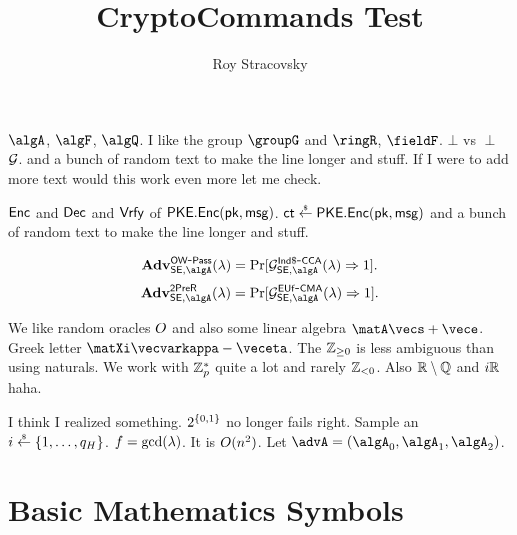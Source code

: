 \documentclass[11pt, oneside]{article}
\title{CryptoCommands Test}
\author{Roy Stracovsky}
\begin{document}
\maketitle


$\algA$, $\algF$, $\algQ$. I like the group $\groupG$ and $\ringR$, $\fieldF$. $\bot$ vs $\perp$
$\mathcal{G}$. and a bunch of random text to make the line longer and stuff. If I were to add more text would this work even more let me check.

$\mathsf{Enc}$ and $\mathsf{Dec}$ and $\mathsf{Vrfy}$ of $\mathsf{PKE}.\mathsf{Enc}(\mathsf{pk}, \mathsf{msg})$.
$\ct \sample \PKEncScheme.\PKEnc(\pk, \msg)$ and a bunch of random text to make the line longer and stuff.

$$ \Adv{\OWPass}{\SEncScheme, \algA}{\secpar} = \Pr[\game^\IndRCCA_{\SEncScheme, \algA}(\secpar) \outputs 1].$$
$$ \Adv{\SecPreimageRes}{\SEncScheme, \algA}{\secpar} = \Pr[\game^\EUfCMA_{\SEncScheme, \algA}(\secpar) \outputs 1].$$

We like random oracles $O$ and also some linear algebra $\matA\vecs + \vece$. Greek letter $\matXi\vecvarkappa - \veceta$. The ${\mathbb{Z}_{\ge 0}}$ is less ambiguous than using naturals.
We work with ${\mathbb{Z}^\ast_{p}}$ quite a lot and rarely ${\mathbb{Z}_{< 0}}$. Also ${\mathbb{R} \setminus \mathbb{Q}}$ and ${i\mathbb{R}}$ haha.

I think I realized something. $2^{\{0, 1\}}$ no longer fails right.
Sample an $i \sample \Range{1}{q_H}$. $f = \gcd(\lambda)$. It is $O(n^2)$.
Let $\advA = (\algA_0, \algA_1, \algA_2)$.

  

\section{Basic Mathematics Symbols}
\end{document}

